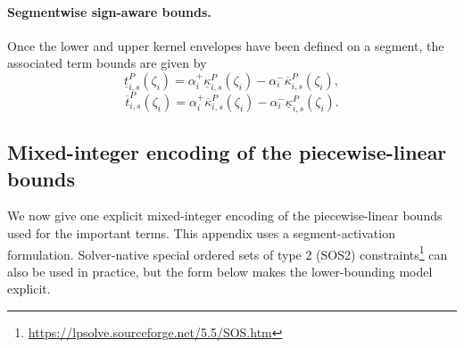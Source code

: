\documentclass[pdflatex,sn-mathphys-num]{sn-jnl}%
\theoremstyle{thmstyleone}%
\theoremstyle{thmstyletwo}%
\theoremstyle{thmstylethree}%
\begin{document}
\paragraph{Segmentwise sign-aware bounds.}
Once the lower and upper kernel envelopes have been defined on a segment, the associated term bounds are given by
\[
\underline{t}^{P}_{i,s}(\zeta_i)
=
\alpha_i^+ \underline{\kappa}^{P}_{i,s}(\zeta_i)
-
\alpha_i^- \overline{\kappa}^{P}_{i,s}(\zeta_i),
\]
\[
\overline{t}^{P}_{i,s}(\zeta_i)
=
\alpha_i^+ \overline{\kappa}^{P}_{i,s}(\zeta_i)
-
\alpha_i^- \underline{\kappa}^{P}_{i,s}(\zeta_i).
\]

\subsection{Mixed-integer encoding of the piecewise-linear bounds}
\label{app:mip_encoding}

We now give one explicit mixed-integer encoding of the piecewise-linear bounds used for the important terms. This appendix uses a segment-activation formulation. Solver-native special ordered sets of type 2 (SOS2) constraints\footnote{\url{https://lpsolve.sourceforge.net/5.5/SOS.htm}} can also be used in practice, but the form below makes the lower-bounding model explicit.
\end{document}
